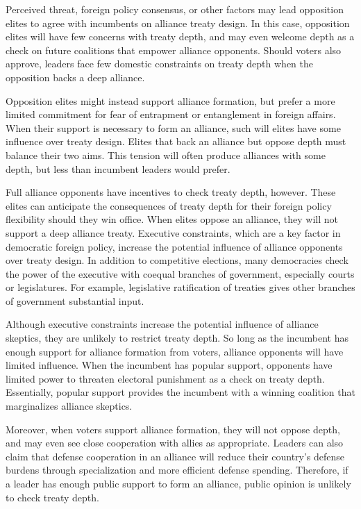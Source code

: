 \documentclass[12pt]{article}
\begin{document}
Perceived threat, foreign policy consensus, or other factors may lead opposition elites to agree with incumbents on alliance treaty design. 
In this case, opposition elites will have few concerns with treaty depth, and may even welcome depth as a check on future coalitions that empower alliance opponents. 
Should voters also approve, leaders face few domestic constraints on treaty depth when the opposition backs a deep alliance. 

Opposition elites might instead support alliance formation, but prefer a more limited commitment for fear of entrapment or entanglement in foreign affairs. 
When their support is necessary to form an alliance, such will elites have some influence over treaty design.
Elites that back an alliance but oppose depth must balance their two aims.
This tension will often produce alliances with some depth, but less than incumbent leaders would prefer.  


Full alliance opponents have incentives to check treaty depth, however.
These elites can anticipate the consequences of treaty depth for their foreign policy flexibility should they win office.
When elites oppose an alliance, they will not support a deep alliance treaty.  
Executive constraints, which are a key factor in democratic foreign policy, increase the potential influence of alliance opponents over treaty design.   
In addition to competitive elections, many democracies check the power of the executive with coequal branches of government, especially courts or legislatures.
For example, legislative ratification of treaties gives other branches of government substantial input. 


Although executive constraints increase the potential influence of alliance skeptics, they are unlikely to restrict treaty depth. 
So long as the incumbent has enough support for alliance formation from voters, alliance opponents will have limited influence.
When the incumbent has popular support, opponents have limited power to threaten electoral punishment as a check on treaty depth. 
Essentially, popular support provides the incumbent with a winning coalition that marginalizes alliance skeptics. 


Moreover, when voters support alliance formation, they will not oppose depth, and may even see close cooperation with allies as appropriate. 
Leaders can also claim that defense cooperation in an alliance will reduce their country's defense burdens through specialization and more efficient defense spending.  
Therefore, if a leader has enough public support to form an alliance, public opinion is unlikely to check treaty depth. 
\end{document}
